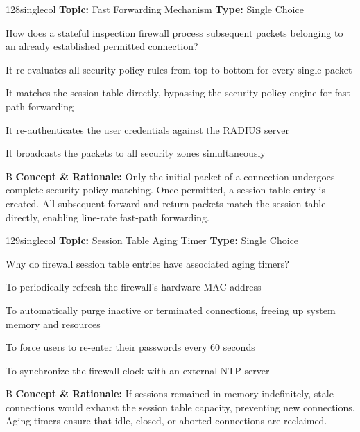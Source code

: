 \begin{qcard}{128}{singlecol}
\textcolor{darkslate!75}{\small\textbf{Topic:} Fast Forwarding Mechanism \hfill \textbf{Type:} Single Choice}\vspace{0.4em}\par
How does a stateful inspection firewall process subsequent packets belonging to an already established permitted connection?
\begin{qoptions}
\item It re-evaluates all security policy rules from top to bottom for every single packet
\item It matches the session table directly, bypassing the security policy engine for fast-path forwarding
\item It re-authenticates the user credentials against the RADIUS server
\item It broadcasts the packets to all security zones simultaneously
\end{qoptions}
\end{qcard}
\nopagebreak
\begin{explainbox}{B}
\textbf{Concept \& Rationale:} Only the initial packet of a connection undergoes complete security policy matching. Once permitted, a session table entry is created. All subsequent forward and return packets match the session table directly, enabling line-rate fast-path forwarding.
\end{explainbox}

\begin{qcard}{129}{singlecol}
\textcolor{darkslate!75}{\small\textbf{Topic:} Session Table Aging Timer \hfill \textbf{Type:} Single Choice}\vspace{0.4em}\par
Why do firewall session table entries have associated aging timers?
\begin{qoptions}
\item To periodically refresh the firewall's hardware MAC address
\item To automatically purge inactive or terminated connections, freeing up system memory and resources
\item To force users to re-enter their passwords every 60 seconds
\item To synchronize the firewall clock with an external NTP server
\end{qoptions}
\end{qcard}
\nopagebreak
\begin{explainbox}{B}
\textbf{Concept \& Rationale:} If sessions remained in memory indefinitely, stale connections would exhaust the session table capacity, preventing new connections. Aging timers ensure that idle, closed, or aborted connections are reclaimed.
\end{explainbox}

